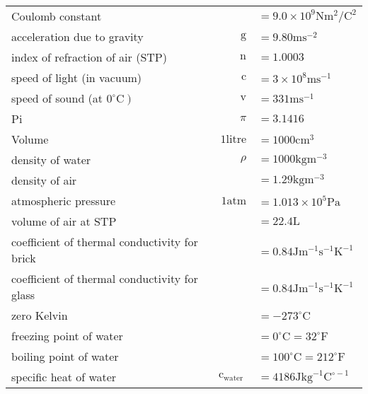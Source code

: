 \documentclass{extarticle}
\begin{document}
\begin{tcolorbox}[enhanced jigsaw,sharp corners,coltext=black,colback=BurntOrange!25!white,boxrule=pt,breakable,size=minimal]
\begin{tabu}{lrl}
Coulomb constant & & $=9.0 \times 10^{9} \mathrm{N} \mathrm{m}^{2} / \mathrm{C}^{2}$ \\

acceleration due to gravity & $\mathrm{g}$ & $=9.80 \mathrm{m} \mathrm{s}^{-2}$ \\



index of refraction of air (STP) & $\mathrm{n}$ & $=1.0003$ \\

speed of light (in vacuum) & $\mathrm{c}$ & $=3 \times 10^{8} \mathrm{ms}^{-1}$ \\

speed of sound (at $\left.0^{\circ} \mathrm{C}\right)$ & $\mathrm{v}$ & $=331 \mathrm{ms}^{-1}$ \\

Pi & $\pi$ & $=3.1416$ \\

Volume & $1 \text {litre}$ & $=1000 \mathrm{cm}^{3}$ \\

density of water & $\rho$ & $=1000 \mathrm{kg} \mathrm{m}^{-3}$ \\

density of air & & $=1.29 \mathrm{kg} \mathrm{m}^{-3}$ \\

atmospheric pressure & $1 \mathrm{atm}$ & $=1.013 \times 10^{5} \mathrm{Pa}$ \\

volume of air at STP & & $=22.4 \mathrm{L}$ \\

coefficient of thermal conductivity for brick & & $=0.84 \mathrm{J} \mathrm{m}^{-1} \mathrm{s}^{-1} \mathrm{K}^{-1}$ \\

coefficient of thermal conductivity for glass & & $=0.84 \mathrm{J} \mathrm{m}^{-1} \mathrm{s}^{-1} \mathrm{K}^{-1}$ \\

zero Kelvin & & $=-273^{\circ} \mathrm{C}$ \\

freezing point of water & & $=0^{\circ} \mathrm{C}=32^{\circ} \mathrm{F}$ \\

boiling point of water & & $=100^{\circ} \mathrm{C}=212^{\circ} \mathrm{F}$ \\

specific heat of water & $\mathrm{c}_{\text {water }}$ & $=4186 \mathrm{J} \mathrm{kg}^{-1} \mathrm{C}^{\circ-1}$ \\


\end{tabu}
\end{tcolorbox}
\end{document}

